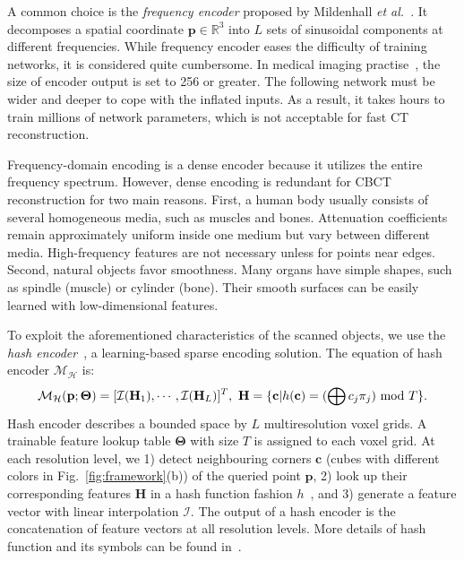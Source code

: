 \documentclass[runningheads]{llncs}
\begin{document}
A common choice is the \textit{frequency encoder} proposed by Mildenhall \textit{et al.}~\cite{mildenhall2020nerf}. It decomposes a spatial coordinate $\mathbf{p}\in\mathbb{R}^{3}$ into $L$ sets of sinusoidal components at different frequencies. While frequency encoder eases the difficulty of training networks, it is considered quite cumbersome. In medical imaging practise~\cite{wu2021irem,zang2021intratomo}, the size of encoder output is set to 256 or greater. The following network must be wider and deeper to cope with the inflated inputs. As a result, it takes hours to train millions of network parameters, which is not acceptable for fast CT reconstruction.

Frequency-domain encoding is a dense encoder because it utilizes the entire frequency spectrum. However, dense encoding is redundant for CBCT reconstruction for two main reasons. First, a  human body usually consists of several homogeneous media, such as muscles and bones. Attenuation coefficients remain approximately uniform inside one medium but vary between different media. High-frequency features are not necessary unless for points near edges. Second, natural objects favor smoothness. Many organs have simple shapes, such as spindle (muscle) or cylinder (bone). Their smooth surfaces can be easily learned with low-dimensional features. 

To exploit the aforementioned characteristics of the scanned objects, we use the \textit{hash encoder}~\cite{mueller2022instant}, a learning-based sparse encoding solution. The equation of hash encoder $\mathcal{M_{H}}$ is: 
\begin{equation}
    \mathcal{M_{H}}(\mathbf{p};\mathbf{\Theta})=[\mathcal{I}(\mathbf{H}_{1}),\cdots,\mathcal{I}(\mathbf{H}_{L})]^T,~\mathbf{H}=\{\mathbf{c}|h(\mathbf{c})=(\bigoplus c_{j}\pi_{j})~{\rm mod}~T\}.
    \end{equation}
Hash encoder describes a bounded space by $L$ multiresolution voxel grids. A trainable feature lookup table $\mathbf{\Theta}$ with size $T$ is assigned to each voxel grid. At each resolution level, we 1) detect neighbouring corners $\mathbf{c}$  (cubes with different colors in Fig.~\ref{fig:framework}(b)) of the queried point $\mathbf{p}$, 2) look up their corresponding features $\mathbf{H}$ in a hash function fashion $h$~\cite{teschner2003optimized}, and 3) generate a feature vector with linear interpolation $\mathcal{I}$. The output of a hash encoder is the concatenation of feature vectors at all resolution levels. More details of hash function and its symbols can be found in~\cite{mueller2022instant}.
\end{document}
